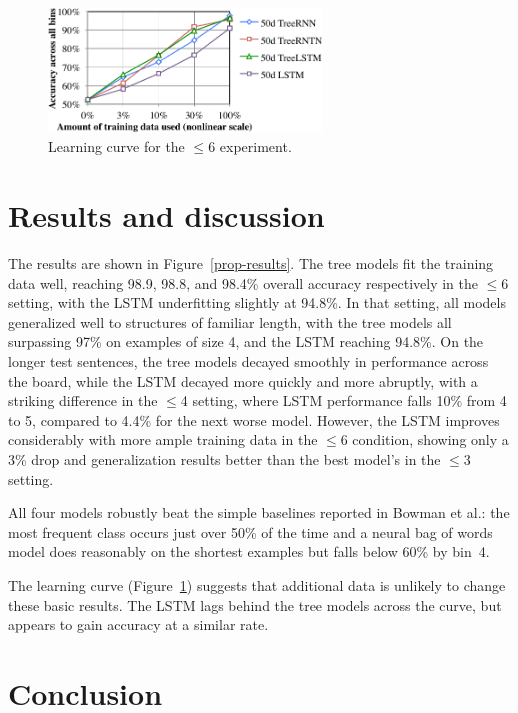 \begin{figure}[t]
  \centering
      \includegraphics[height=1.3in]{lcc.pdf}
  \caption{Learning curve for the $\le$6 experiment.}
  \label{fig:lc} 
\end{figure}

\section{Results and discussion}\label{sec:discussion}

The results are shown in Figure~\ref{prop-results}. 
The tree models fit the training data well, reaching 98.9, 98.8, and 98.4\% overall accuracy respectively in the $\le$6 setting, with the LSTM underfitting slightly at 94.8\%. 
In that setting, all models generalized well to structures of familiar length, with the tree models all surpassing 97\% on examples of size 4, and the LSTM reaching 94.8\%.
On the longer test sentences, the tree models decayed smoothly in performance across the board, while the LSTM decayed more quickly and more abruptly, with a striking difference in the $\le$4 setting, where LSTM performance falls 10\% from 4 to 5, compared to 4.4\% for the next worse model. However, the LSTM improves considerably with more ample training data in the $\le$6 condition, showing only a 3\% drop and generalization results better than the best model's in the $\le$3 setting.

All four models robustly beat the simple baselines reported in Bowman et al.: the most frequent class occurs just over 50\% of the time and a neural bag of words model does reasonably on the shortest examples but falls below 60\% by bin~4.

The learning curve (Figure~\ref{fig:lc}) suggests that additional data is unlikely to change these basic results. The LSTM lags behind the tree models across the curve, but appears to gain accuracy at a similar rate.

\section{Conclusion}

